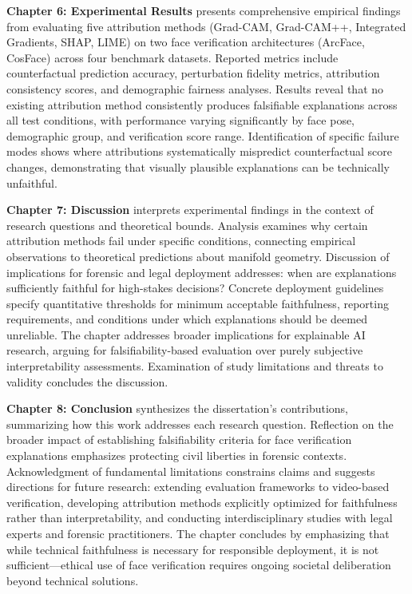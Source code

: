 \textbf{Chapter 6: Experimental Results} presents comprehensive empirical findings from evaluating five attribution methods (Grad-CAM, Grad-CAM++, Integrated Gradients, SHAP, LIME) on two face verification architectures (ArcFace, CosFace) across four benchmark datasets. Reported metrics include counterfactual prediction accuracy, perturbation fidelity metrics, attribution consistency scores, and demographic fairness analyses. Results reveal that no existing attribution method consistently produces falsifiable explanations across all test conditions, with performance varying significantly by face pose, demographic group, and verification score range. Identification of specific failure modes shows where attributions systematically mispredict counterfactual score changes, demonstrating that visually plausible explanations can be technically unfaithful.

\textbf{Chapter 7: Discussion} interprets experimental findings in the context of research questions and theoretical bounds. Analysis examines why certain attribution methods fail under specific conditions, connecting empirical observations to theoretical predictions about manifold geometry. Discussion of implications for forensic and legal deployment addresses: when are explanations sufficiently faithful for high-stakes decisions? Concrete deployment guidelines specify quantitative thresholds for minimum acceptable faithfulness, reporting requirements, and conditions under which explanations should be deemed unreliable. The chapter addresses broader implications for explainable AI research, arguing for falsifiability-based evaluation over purely subjective interpretability assessments. Examination of study limitations and threats to validity concludes the discussion.

\textbf{Chapter 8: Conclusion} synthesizes the dissertation's contributions, summarizing how this work addresses each research question. Reflection on the broader impact of establishing falsifiability criteria for face verification explanations emphasizes protecting civil liberties in forensic contexts. Acknowledgment of fundamental limitations constrains claims and suggests directions for future research: extending evaluation frameworks to video-based verification, developing attribution methods explicitly optimized for faithfulness rather than interpretability, and conducting interdisciplinary studies with legal experts and forensic practitioners. The chapter concludes by emphasizing that while technical faithfulness is necessary for responsible deployment, it is not sufficient---ethical use of face verification requires ongoing societal deliberation beyond technical solutions.


